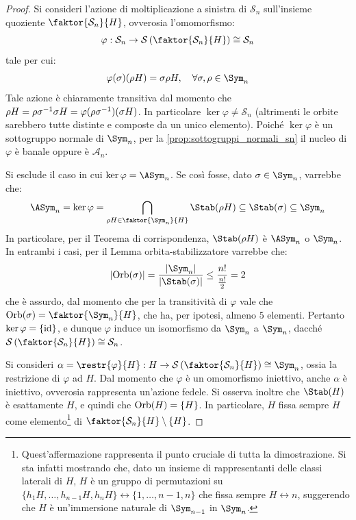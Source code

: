 \documentclass[11pt]{scrartcl}
\begin{document}
	\begin{proof}
		Si consideri l'azione di moltiplicazione a sinistra di $\mathcal{S}_n$ sull'insieme
		quoziente $\faktor{\mathcal{S}_n}{H}$, ovverosia l'omomorfismo:
		\[
		\varphi: \mathcal{S}_n \to \mathcal{S}\left(\faktor{\mathcal{S}_n}{H}\right) \cong \mathcal{S}_n
		\]
		tale per cui:
		\[
			\varphi(\sigma)(\rho H) = \sigma \rho H, \quad \forall \sigma, \rho \in \Sym_n
		\]
		Tale azione è chiaramente transitiva dal momento che $\rho H = \rho \sigma^{-1} \sigma H = \varphi(\rho \sigma^{-1})(\sigma H)$.
		In particolare $\ker \varphi \neq \mathcal{S}_n$ (altrimenti le orbite sarebbero tutte distinte e composte da un unico elemento). Poiché $\ker\varphi$ è un sottogruppo normale di $\Sym_n$, per la
		\autoref{prop:sottogruppi_normali_sn}
		il nucleo di $\varphi$ è banale oppure è $\mathcal{A}_n$. \medskip
		
		
		Si esclude il caso in cui $\ker \varphi = \ASym_n$. Se così fosse, dato $\sigma \in \Sym_n$,
		varrebbe che:
		\[ \ASym_n = \ker \varphi = \bigcap_{\rho H \in \faktor{\Sym_n}{H}} \Stab(\rho H) \subseteq \Stab(\sigma) \subseteq \Sym_n \]
		In particolare, per il Teorema di corrispondenza, $\Stab(\rho H)$ è $\ASym_n$ o $\Sym_n$. In entrambi
		i casi,
		per il Lemma orbita-stabilizzatore varrebbe che:
		\[ \abs{\Orb(\sigma)} = \frac{\abs{\Sym_n}}{\abs{\Stab(\sigma)}} \leq \frac{n!}{\frac{n!}{2}} = 2 \]
		che è assurdo, dal momento che per la transitività di $\varphi$ vale che $\Orb(\sigma) = \faktor{\Sym_n}{H}$, che ha, per ipotesi, almeno $5$ elementi. Pertanto $\ker \varphi = \{\mathrm{id}\}$,
		e dunque $\varphi$ induce un isomorfismo da $\Sym_n$ a $\Sym_n$, dacché
		$\mathcal{S}\left(\faktor{\mathcal{S}_n}{H}\right) \cong \mathcal{S}_n$. \medskip

		Si consideri $\alpha = \restr{\varphi}{H} : H \to \mathcal{S}\left(\faktor{\mathcal{S}_n}{H}\right) \cong \Sym_{n}$,
		ossia la restrizione di $\varphi$ ad $H$. Dal momento che $\varphi$ è un omomorfismo iniettivo, anche
		$\alpha$ è iniettivo, ovverosia rappresenta un'azione fedele. Si osserva inoltre che
		$\Stab(H)$ è esattamente $H$, e quindi che $\operatorname{Orb}(H) = \{H\}$. In particolare, $H$ fissa sempre
		$H$ come elemento\footnote{
			Quest'affermazione rappresenta il punto cruciale di tutta la dimostrazione. Si sta infatti
			mostrando che, dato un insieme di rappresentanti delle classi laterali di $H$, $H$ è un gruppo di permutazioni su $\{h_1 H, \ldots, h_{n-1} H, h_n H\} \leftrightarrow \{1, \ldots, n-1, n\}$ che fissa
			sempre $H \leftrightarrow n$, suggerendo che $H$ è un'immersione naturale di $\Sym_{n-1}$ in $\Sym_n$.
		} di $\faktor{\mathcal{S}_n}{H} \setminus \{H\}$. \medskip
		

\end{proof}
\end{document}
